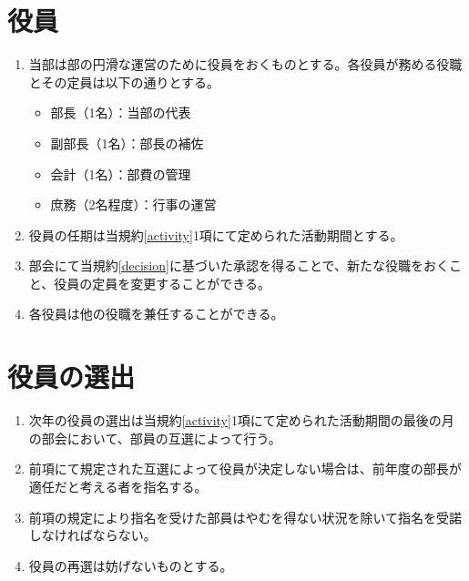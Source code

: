 \documentclass[12pt, unicode, a4paper]{ltjsreport}
\begin{document}
    \section{役員}\label{directors}
        \begin{enumerate}
            \item 当部は部の円滑な運営のために役員をおくものとする。各役員が務める役職とその定員は以下の通りとする。
            \begin{itemize}
                \item 部長（1名）：当部の代表
                \item 副部長（1名）：部長の補佐
                \item 会計（1名）：部費の管理
                \item 庶務（2名程度）：行事の運営
            \end{itemize}
            \item 役員の任期は当規約\ref{activity}1項にて定められた活動期間とする。
            \item 部会にて当規約\ref{decision}に基づいた承認を得ることで、新たな役職をおくこと、役員の定員を変更することができる。
            \item 各役員は他の役職を兼任することができる。
        \end{enumerate}

    \section{役員の選出}\label{election}
        \begin{enumerate}
            \item 次年の役員の選出は当規約\ref{activity}1項にて定められた活動期間の最後の月の部会において、部員の互選によって行う。
            \item 前項にて規定された互選によって役員が決定しない場合は、前年度の部長が適任だと考える者を指名する。
            \item 前項の規定により指名を受けた部員はやむを得ない状況を除いて指名を受諾しなければならない。
            \item 役員の再選は妨げないものとする。
        \end{enumerate}
\end{document}
